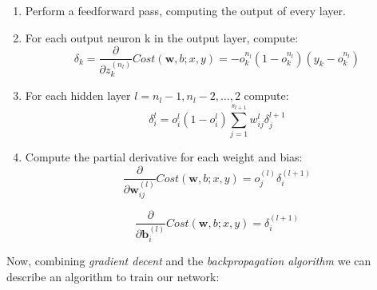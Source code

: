 \begin{enumerate}
	\item Perform a feedforward pass, computing the output of every layer.
	\item For each output neuron k in the output layer, compute: 
	\begin{equation*}
		\delta_k = \frac{\partial}{\partial z_{k}^{(n_l)} }Cost(\mathbf{w},b; x, y) = -o_k^{n_l}(1-o_k^{n_l})(y_k-o_k^{n_l})
	\end{equation*} 
	\item For each hidden layer $ l = n_l - 1, n_l - 2,\dots, 2 $ compute: 
	\begin{equation*}
		\delta_i^{l} = o_i^l(1-o_i^l)\sum_{j=1}^{s_{l+1}} w_{ij}^l \delta_j^{l+1} 
	\end{equation*}
	\item Compute the partial derivative for each weight and bias:
	\begin{equation*}
		\frac{\partial}{\partial\mathbf{w}_{ij}^{(l)} }Cost(\mathbf{w},b; x, y) = o_j^{(l)}\delta_i^{(l+1)}
	\end{equation*}
	
	\begin{equation*}
		\frac{\partial}{\partial\mathbf{b}_{i}^{(l)} }Cost(\mathbf{w},b; x, y) = \delta_i^{(l+1)}
	\end{equation*}
\end{enumerate}
	
Now, combining \textit{gradient decent} and the \textit{backpropagation algorithm} we can describe an algorithm to train our network: 

